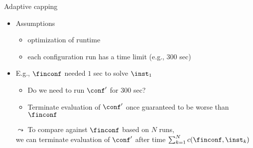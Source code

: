 \begin{frame}[c,fragile]{Adaptive capping }

\begin{itemize}
	\item Assumptions
	\begin{itemize} 
		\item optimization of runtime
		\item each configuration run has a time limit (e.g., $300$ sec)
	\end{itemize}
	\pause    
	
	\item E.g., $\finconf$ needed $1$ sec to solve $\inst_1$
	\begin{itemize}
		\item Do we need to run $\conf'$ for $300$ sec?
		\item Terminate evaluation of $\conf'$ once guaranteed to be worse than $\finconf$
	\end{itemize}
	\pause
	\bigskip    
	\item[$\leadsto$] To compare against $\finconf$ based on $N$ runs,\\ we can terminate evaluation of $\conf'$ after time $\sum_{k=1}^N c(\finconf,\inst_k)$
\end{itemize}

\end{frame}
